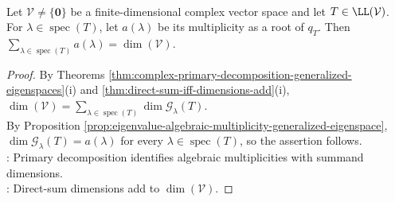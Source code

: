\begin{proposition} \label{prop:sum-of-complex-eigenvalue-multiplicities} \\
Let $\mathcal{V}\neq\{\mathbf{0}\}$ be a finite-dimensional complex vector space and let $T\in\LL(\mathcal{V})$.\\
For $\lambda\in\operatorname{spec}(T)$, let $a(\lambda)$ be its multiplicity as a root of $q_T$. Then $\sum\limits_{\lambda\in\operatorname{spec}(T)}a(\lambda)=\dim(\mathcal{V})$.
\begin{proof}
By Theorems \ref{thm:complex-primary-decomposition-generalized-eigenspaces}(i) and \ref{thm:direct-sum-iff-dimensions-add}(i), $\dim(\mathcal{V})=\sum\limits_{\lambda\in\operatorname{spec}(T)}\dim \mathcal{G}_{\lambda}(T)$.\\
By Proposition \ref{prop:eigenvalue-algebraic-multiplicity-generalized-eigenspace}, $\dim\mathcal{G}_{\lambda}(T)=a(\lambda)$ for every $\lambda\in\operatorname{spec}(T)$, so the assertion follows.\\
: Primary decomposition identifies algebraic multiplicities with summand dimensions.\\
: Direct-sum dimensions add to $\dim(\mathcal{V})$.
\end{proof}
\end{proposition}
